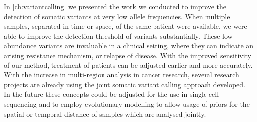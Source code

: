 In \autoref{ch:variantcalling} we presented the work we conducted to improve the detection of somatic variants at very low allele frequencies. When multiple samples, separated in time or space, of the same patient were available, we were able to improve the detection threshold of variants substantially. These low abundance variants are invaluable in a clinical setting, where they can indicate an arising resistance mechanism, or relapse of disease. With the improved sensitivity of our method, treatment of patients can be adjusted earlier and more accurately. With the increase in multi-region analysis in cancer research, several research projects are already using the joint somatic variant calling approach developed. In the future these concepts could be adjusted for the use in single cell sequencing and to employ evolutionary modelling to allow usage of priors for the spatial or temporal distance of samples which are analysed jointly.


